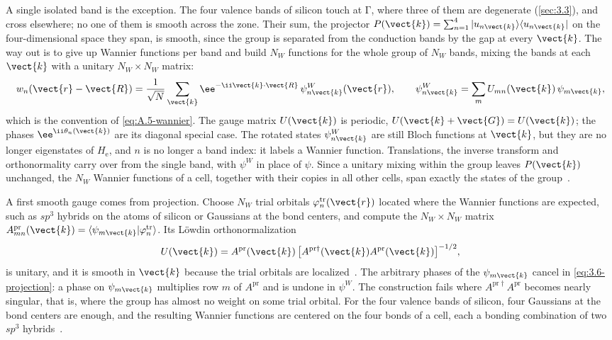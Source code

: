 A single isolated band is the exception. The four valence bands of silicon touch at $\mathrm{\Gamma}$, where three of them are degenerate (\cref{sec:3.3}), and cross elsewhere; no one of them is smooth across the zone. Their sum, the projector $P(\vect{k}) = \sum_{n=1}^{4}|u_{n\vect{k}}\rangle\langle u_{n\vect{k}}|$ on the four-dimensional space they span, is smooth, since the group is separated from the conduction bands by the gap at every $\vect{k}$. The way out is to give up Wannier functions per band and build $N_W$ functions for the whole group of $N_W$ bands, mixing the bands at each $\vect{k}$ with a unitary $N_W\times N_W$ matrix:
\begin{equation}
  w_n(\vect{r} - \vect{R}) = \frac{1}{\sqrt N}\sum_{\vect{k}}\ee^{-\ii\vect{k}\cdot\vect{R}}\,\psi^W_{n\vect{k}}(\vect{r}), \qquad
  \psi^W_{n\vect{k}} = \sum_m U_{mn}(\vect{k})\,\psi_{m\vect{k}} ,
  \label{eq:3.6-wannier}
\end{equation}
which is the convention of \cref{eq:A.5-wannier}. The gauge matrix $U(\vect{k})$ is periodic, $U(\vect{k} + \vect{G}) = U(\vect{k})$; the phases $\ee^{\ii\theta_n(\vect{k})}$ are its diagonal special case. The rotated states $\psi^W_{n\vect{k}}$ are still Bloch functions at $\vect{k}$, but they are no longer eigenstates of $H_{\mathrm{e}}$, and $n$ is no longer a band index: it labels a Wannier function. Translations, the inverse transform and orthonormality carry over from the single band, with $\psi^W$ in place of $\psi$. Since a unitary mixing within the group leaves $P(\vect{k})$ unchanged, the $N_W$ Wannier functions of a cell, together with their copies in all other cells, span exactly the states of the group~\cite[Eqs.~(8)--(10)]{marzari2012maximally}.

A first smooth gauge comes from projection. Choose $N_W$ trial orbitals $\varphi^{\mathrm{tr}}_n(\vect{r})$ located where the Wannier functions are expected, such as $sp^3$ hybrids on the atoms of silicon or Gaussians at the bond centers, and compute the $N_W\times N_W$ matrix $A^{\mathrm{pr}}_{mn}(\vect{k}) = \langle\psi_{m\vect{k}}|\varphi^{\mathrm{tr}}_n\rangle$. Its L\"owdin orthonormalization
\begin{equation}
  U(\vect{k}) = A^{\mathrm{pr}}(\vect{k})\,\bigl[A^{\mathrm{pr}\dagger}(\vect{k})A^{\mathrm{pr}}(\vect{k})\bigr]^{-1/2} ,
  \label{eq:3.6-projection}
\end{equation}
is unitary, and it is smooth in $\vect{k}$ because the trial orbitals are localized~\cite[Eqs.~(16) and (17)]{marzari2012maximally}. The arbitrary phases of the $\psi_{m\vect{k}}$ cancel in \cref{eq:3.6-projection}: a phase on $\psi_{m\vect{k}}$ multiplies row $m$ of $A^{\mathrm{pr}}$ and is undone in $\psi^W$. The construction fails where $A^{\mathrm{pr}\dagger}A^{\mathrm{pr}}$ becomes nearly singular, that is, where the group has almost no weight on some trial orbital. For the four valence bands of silicon, four Gaussians at the bond centers are enough, and the resulting Wannier functions are centered on the four bonds of a cell, each a bonding combination of two $sp^3$ hybrids~\cite[Fig.~2]{marzari2012maximally}.

